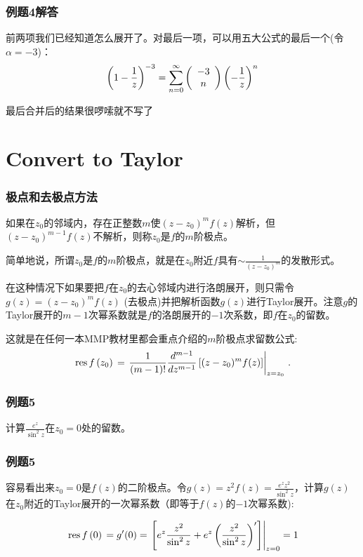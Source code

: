 \documentclass[CJK,13pt]{beamer}
\begin{document}
\begin{frame}
  \frametitle{例题4解答}
  
  前两项我们已经知道怎么展开了。对最后一项，可以用五大公式的最后一个(令$\alpha=-3$)：
  $$  \left(1-\frac{1}{z}\right)^{-3} = \sum_{n=0}^\infty \left(\begin{array}{c}-3\\ n\end{array}\right)\left(-\frac{1}{z}\right)^n$$
  
  \bye 最后合并后的结果很啰嗦就不写了
  
\end{frame}

\section{Convert to Taylor}

\begin{frame}
  \frametitle{极点和去极点方法}
  
          {\blue  如果在$z_0$的邻域内，存在正整数$m$使$(z-z_0)^mf(z)$解析，但$(z-z_0)^{m-1}f(z)$不解析，则称$z_0$是$f$的$m$阶极点。}

          \skiplines

          简单地说，所谓$z_0$是$f$的$m$阶极点，就是在$z_0$附近$f$具有$\sim \frac{1}{(z-z_0)^m}$的发散形式。

          \skiplines
          
          在这种情况下如果要把$f$在$z_0$的去心邻域内进行洛朗展开，则只需令$g(z) = (z-z_0)^mf(z)$ (去极点)并把解析函数$g(z)$进行Taylor展开。注意$g$的Taylor展开的$m-1$次幂系数就是$f$的洛朗展开的$-1$次系数，即$f$在$z_0$的留数。

            这就是在任何一本MMP教材里都会重点介绍的{\blue $m$阶极点求留数公式:
            $$\,\mathrm{res}\,f\left(z_0\right)\, = \left.\frac{1}{(m-1)!}\frac{d^{m-1}}{dz^{m-1}} \left[(z-z_0)^mf(z)\right] \right\vert_{z=z_0}\, .$$
        }
          
\end{frame}

\begin{frame}
  \frametitle{例题5}
  
  
  计算$\frac{e^z}{\sin^2 z}$在$z_0=0$处的留数。
  
\end{frame}

\begin{frame}
  \frametitle{例题5}
  
  容易看出来$z_0=0$是$f(z)$的二阶极点。令$g(z) = z^2 f(z) = \frac{e^zz^2}{\sin^2 z}$，计算$g(z)$在$z_0$附近的Taylor展开的一次幂系数（即等于$f(z)$的$-1$次幂系数):

    $$\,\mathrm{res}\,f\left(0\right)\, = g'(0) =\left.\left[ e^z\frac{z^2}{\sin^2z} + e^z\left(\frac{z^2}{\sin^2z}\right)'\right]\right\vert_{z=0} = 1$$

    
  
\end{frame}
\end{document}
